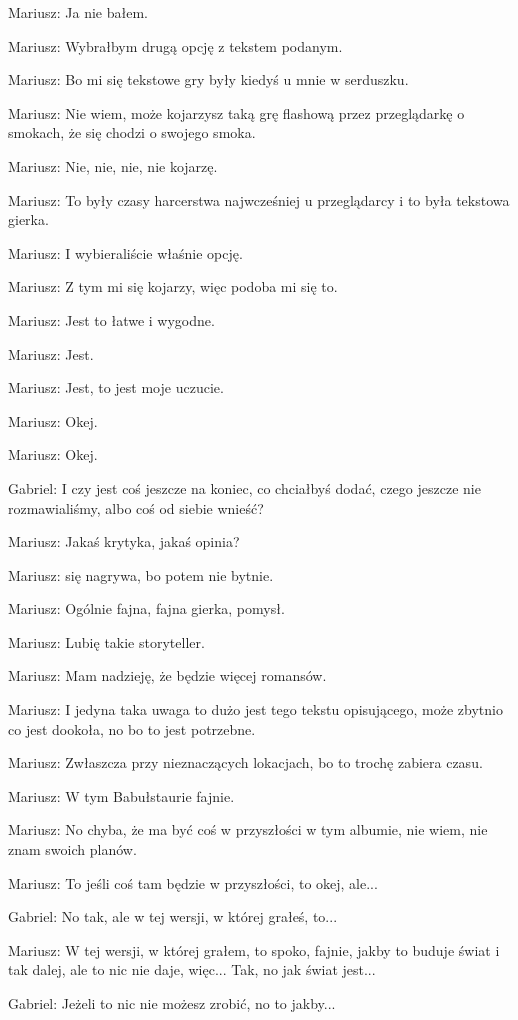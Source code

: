 Mariusz: Ja nie bałem.

Mariusz: Wybrałbym drugą opcję z tekstem podanym.

Mariusz: Bo mi się tekstowe gry były kiedyś u mnie w serduszku.

Mariusz: Nie wiem, może kojarzysz taką grę flashową przez przeglądarkę o smokach, że się chodzi o swojego smoka.

Mariusz: Nie, nie, nie, nie kojarzę.

Mariusz: To były czasy harcerstwa najwcześniej u przeglądarcy i to była tekstowa gierka.

Mariusz: I wybieraliście właśnie opcję.

Mariusz: Z tym mi się kojarzy, więc podoba mi się to.

Mariusz: Jest to łatwe i wygodne.

Mariusz: Jest.

Mariusz: Jest, to jest moje uczucie.

Mariusz: Okej.

Mariusz: Okej.

Gabriel: I czy jest coś jeszcze na koniec, co chciałbyś dodać, czego jeszcze nie rozmawialiśmy, albo coś od siebie wnieść?

Mariusz: Jakaś krytyka, jakaś opinia?

Mariusz: się nagrywa, bo potem nie bytnie.

Mariusz: Ogólnie fajna, fajna gierka, pomysł.

Mariusz: Lubię takie storyteller.

Mariusz: Mam nadzieję, że będzie więcej romansów.

Mariusz: I jedyna taka uwaga to dużo jest tego tekstu opisującego, może zbytnio co jest dookoła, no bo to jest potrzebne.

Mariusz: Zwłaszcza przy nieznaczących lokacjach, bo to trochę zabiera czasu.

Mariusz: W tym Babułstaurie fajnie.

Mariusz: No chyba, że ma być coś w przyszłości w tym albumie, nie wiem, nie znam swoich planów.

Mariusz: To jeśli coś tam będzie w przyszłości, to okej, ale...

Gabriel: No tak, ale w tej wersji, w której grałeś, to...

Mariusz: W tej wersji, w której grałem, to spoko, fajnie, jakby to buduje świat i tak dalej, ale to nic nie daje, więc... Tak, no jak świat jest...

Gabriel: Jeżeli to nic nie możesz zrobić, no to jakby...

